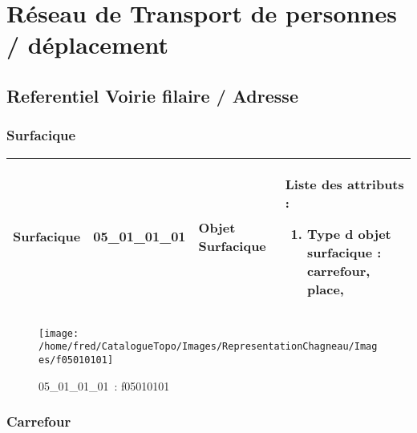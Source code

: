 \documentclass[12pt,titlepage]{book}
\begin{document}
\chapter{Réseau de Transport de personnes / déplacement}
\section{\large Referentiel Voirie filaire / Adresse}
\subsection{Surfacique}
\noindent
\vspace{\baselineskip}

\renewcommand{\arraystretch}{1.2}
\begin{supertabular}{|p{10cm}|c|p{13cm}|p{12cm}|}
 Surfacique & 05\_01\_01\_01 & Objet Surfacique & Liste des attributs :
\begin{enumerate}
  \item Type d objet surfacique : carrefour, place,\end{enumerate}
\\
\hline
\end{supertabular}
\begin{figure}[h!]
  \hfill         %
  \begin{minipage}[t]{3cm}
    \begin{center}
      \texttt{[image: /home/fred/CatalogueTopo/Images/RepresentationChagneau/Images/f05010101]}
      \caption[~05\_01\_01\_01]{\small{05\_01\_01\_01~:} \tiny{f05010101}}\label{f05010101}
    \end{center}
  \end{minipage}
\end{figure}


\subsection{Carrefour}
\noindent
\vspace{\baselineskip}
\end{document}
